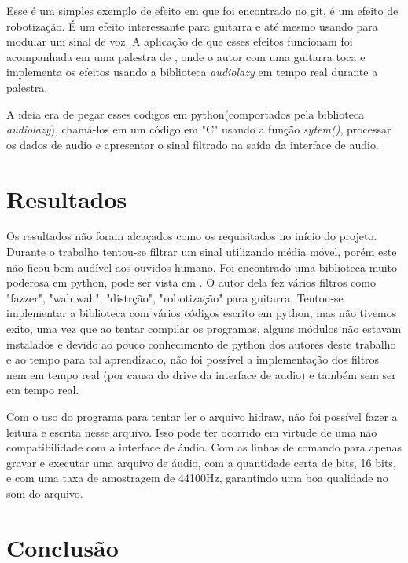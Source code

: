 \documentclass[conference]{IEEEtran}
\begin{document}
Esse é um simples exemplo de efeito em que foi encontrado no git, é um efeito de robotização. É um efeito interessante para guitarra e até mesmo usando para modular um sinal de voz. A aplicação de que esses efeitos funcionam foi acompanhada em uma palestra de \cite{audiolazy}, onde o autor com uma guitarra toca e  implementa os efeitos usando a biblioteca \textit{audiolazy} em tempo real durante a palestra.

A ideia era de pegar esses codigos em python(comportados pela biblioteca \textit{audiolazy}), chamá-los em um código em "C" usando a função \textit{sytem()}, processar os dados de audio e apresentar o sinal filtrado na saída da interface de audio.



\section{Resultados}

Os resultados não foram alcaçados como os requisitados no início do projeto. Durante o trabalho tentou-se filtrar um sinal utilizando média móvel, porém este não ficou bem audível aos ouvidos humano.  Foi encontrado uma biblioteca muito poderosa em python, pode ser vista em \cite{audiolazy}. O autor dela fez vários filtros como "fazzer", "wah wah", "distrção", "robotização" para guitarra. Tentou-se implementar a biblioteca com vários códigos escrito em python, mas não tivemos exito, uma vez que ao tentar compilar os programas, alguns módulos não estavam instalados e devido ao pouco conhecimento de python dos autores deste trabalho e ao tempo para tal aprendizado, não foi possível a implementação dos filtros nem em tempo real (por causa do drive da interface de audio) e também sem ser em tempo real.

Com o uso do programa para tentar ler o arquivo hidraw, não foi possível fazer a leitura e escrita nesse arquivo. Isso pode ter ocorrido em virtude de uma não compatibilidade com a interface de áudio. Com as linhas de comando para apenas gravar e executar uma arquivo de áudio, com a quantidade certa de bits, 16 bits, e com uma taxa de amostragem de 44100Hz, garantindo uma boa qualidade no som do arquivo.

\section{Conclusão}
\end{document}
